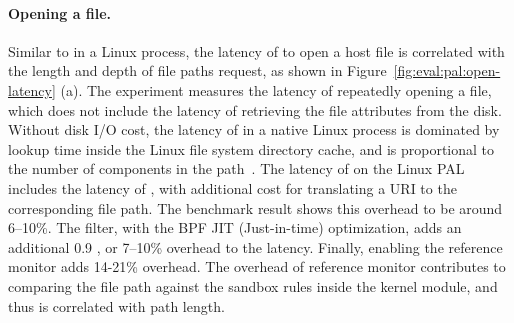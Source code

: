 \paragraph{Opening a file.}
Similar to  in a Linux process,
the latency of  to open a host file
is correlated with the length and depth
of file paths request,
as shown in Figure~\ref{fig:eval:pal:open-latency} (a).
The experiment
measures the latency of repeatedly opening a file,
which does not include the latency of retrieving the file attributes from the disk.
Without disk I/O cost,
the latency of 
in a native Linux process is dominated by lookup time inside the Linux file system directory cache,
and is proportional to the number of components in the path~\cite{tsai15dcache}.
The latency of  on the Linux PAL includes the latency of ,
with additional cost for translating a URI
to the corresponding file path.
The benchmark result shows this overhead to be around
6--10\%.
The \seccomp{} filter, with the BPF JIT (Just-in-time) optimization,
adds an additional \roughly{}0.9 \usec{},
or 7--10\% overhead to the latency.
Finally, enabling the reference monitor
adds 14-21\% overhead.
The overhead of reference monitor
contributes to comparing the file path against
the sandbox rules
inside the kernel module,
and thus is correlated with path length.


